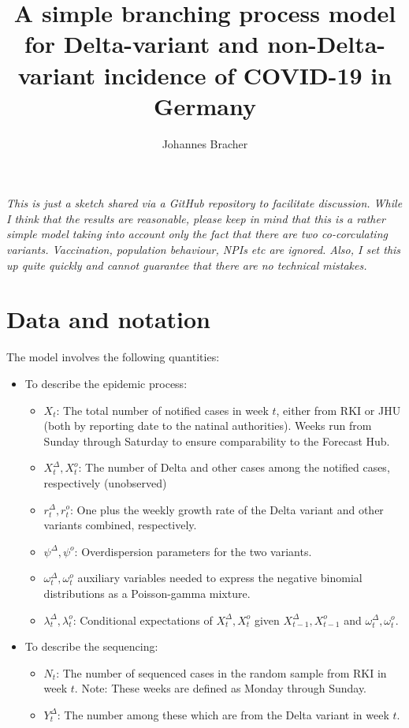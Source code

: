 \documentclass{article}
\begin{document}
\title{A simple branching process model for Delta-variant and non-Delta-variant incidence of COVID-19 in Germany}
\author{Johannes Bracher}


\maketitle
\bigskip

\textit{This is just a sketch shared via a GitHub repository to facilitate discussion. While I think that the results are reasonable, please keep in mind that this is a rather simple model taking into account only the fact that there are two co-corculating variants. Vaccination, population behaviour, NPIs etc are ignored. Also, I set this up quite quickly and cannot guarantee that there are no technical mistakes.}

\section{Data and notation}

The model involves the following quantities:

\begin{itemize}
\item To describe the epidemic process:
\begin{itemize}
\item $X_t$: The total number of notified cases in week $t$, either from RKI or JHU (both by reporting date to the natinal authorities). Weeks run from Sunday through Saturday to ensure comparability to the Forecast Hub.
\item $X^\Delta_t, X^o_t$: The number of Delta and other cases among the notified cases, respectively (unobserved)
\item $r^\Delta_t, r^o_t$: One plus the weekly growth rate of the Delta variant and other variants combined, respectively.
\item $\psi^\Delta, \psi^o$: Overdispersion parameters for the two variants.
\item $\omega^\Delta_t, \omega^o_t$ auxiliary variables needed to express the negative binomial distributions as a Poisson-gamma mixture.
\item $\lambda^\Delta_t, \lambda^o_t$: Conditional expectations of $X^\Delta_t, X^o_t$ given $X^\Delta_{t - 1}, X^o_{t - 1}$ and $\omega^\Delta_t, \omega^o_t$.
\end{itemize}
\item To describe the sequencing:
\begin{itemize}
\item $N_t$: The number of sequenced cases in the random sample from RKI in week $t$. Note: These weeks are defined as Monday through Sunday.
\item $Y^\Delta_t$: The number among these which are from the Delta variant in week $t$.
\end{itemize}
\end{itemize}
\end{document}

